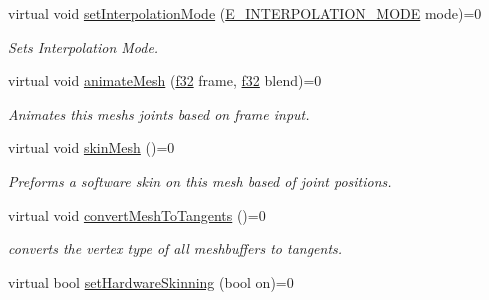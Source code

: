 \begin{DoxyCompactItemize}
\mbox{\label{classirr_1_1scene_1_1ISkinnedMesh_afbb087c018dac08007ff5d22c6fe86b9}} 
virtual void \hyperlink{classirr_1_1scene_1_1ISkinnedMesh_afbb087c018dac08007ff5d22c6fe86b9}{set\+Interpolation\+Mode} (\hyperlink{namespaceirr_1_1scene_a26f30865cf5527e7255a8495e280314c}{E\+\_\+\+I\+N\+T\+E\+R\+P\+O\+L\+A\+T\+I\+O\+N\+\_\+\+M\+O\+DE} mode)=0
\begin{DoxyCompactList}\small\item\em Sets Interpolation Mode. \end{DoxyCompactList}\item 
\mbox{\label{classirr_1_1scene_1_1ISkinnedMesh_a5cbb9dad48413636f9e9c2ac9201cfae}} 
virtual void \hyperlink{classirr_1_1scene_1_1ISkinnedMesh_a5cbb9dad48413636f9e9c2ac9201cfae}{animate\+Mesh} (\hyperlink{namespaceirr_a0277be98d67dc26ff93b1a6a1d086b07}{f32} frame, \hyperlink{namespaceirr_a0277be98d67dc26ff93b1a6a1d086b07}{f32} blend)=0
\begin{DoxyCompactList}\small\item\em Animates this mesh\textquotesingle{}s joints based on frame input. \end{DoxyCompactList}\item 
\mbox{\label{classirr_1_1scene_1_1ISkinnedMesh_a3bd5dd1429c13bce259557875a5bbe7d}} 
virtual void \hyperlink{classirr_1_1scene_1_1ISkinnedMesh_a3bd5dd1429c13bce259557875a5bbe7d}{skin\+Mesh} ()=0
\begin{DoxyCompactList}\small\item\em Preforms a software skin on this mesh based of joint positions. \end{DoxyCompactList}\item 
virtual void \hyperlink{classirr_1_1scene_1_1ISkinnedMesh_ae63f3f1a74bf38c4b5113e3a5b96c0f3}{convert\+Mesh\+To\+Tangents} ()=0
\begin{DoxyCompactList}\small\item\em converts the vertex type of all meshbuffers to tangents. \end{DoxyCompactList}\item 
\mbox{\label{classirr_1_1scene_1_1ISkinnedMesh_a42ff192210ffc61a4c9fe8184b466b17}} 
virtual bool \hyperlink{classirr_1_1scene_1_1ISkinnedMesh_a42ff192210ffc61a4c9fe8184b466b17}{set\+Hardware\+Skinning} (bool on)=0

\end{DoxyCompactItemize}
